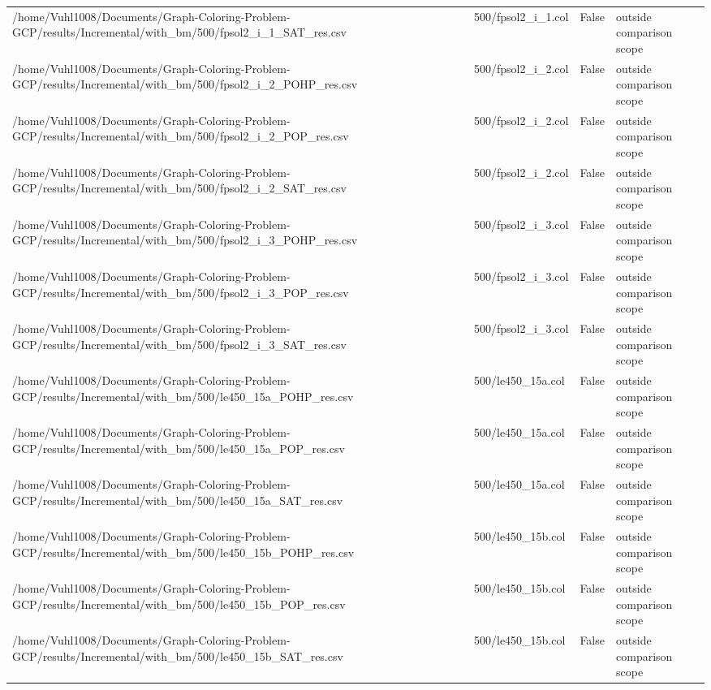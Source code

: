 \begin{table}[htbp]
\begin{tabular}{llll}
/home/Vuhl1008/Documents/Graph-Coloring-Problem-GCP/results/Incremental/with\_bm/500/fpsol2\_i\_1\_SAT\_res.csv & 500/fpsol2\_i\_1.col & False & outside comparison scope \\
/home/Vuhl1008/Documents/Graph-Coloring-Problem-GCP/results/Incremental/with\_bm/500/fpsol2\_i\_2\_POHP\_res.csv & 500/fpsol2\_i\_2.col & False & outside comparison scope \\
/home/Vuhl1008/Documents/Graph-Coloring-Problem-GCP/results/Incremental/with\_bm/500/fpsol2\_i\_2\_POP\_res.csv & 500/fpsol2\_i\_2.col & False & outside comparison scope \\
/home/Vuhl1008/Documents/Graph-Coloring-Problem-GCP/results/Incremental/with\_bm/500/fpsol2\_i\_2\_SAT\_res.csv & 500/fpsol2\_i\_2.col & False & outside comparison scope \\
/home/Vuhl1008/Documents/Graph-Coloring-Problem-GCP/results/Incremental/with\_bm/500/fpsol2\_i\_3\_POHP\_res.csv & 500/fpsol2\_i\_3.col & False & outside comparison scope \\
/home/Vuhl1008/Documents/Graph-Coloring-Problem-GCP/results/Incremental/with\_bm/500/fpsol2\_i\_3\_POP\_res.csv & 500/fpsol2\_i\_3.col & False & outside comparison scope \\
/home/Vuhl1008/Documents/Graph-Coloring-Problem-GCP/results/Incremental/with\_bm/500/fpsol2\_i\_3\_SAT\_res.csv & 500/fpsol2\_i\_3.col & False & outside comparison scope \\
/home/Vuhl1008/Documents/Graph-Coloring-Problem-GCP/results/Incremental/with\_bm/500/le450\_15a\_POHP\_res.csv & 500/le450\_15a.col & False & outside comparison scope \\
/home/Vuhl1008/Documents/Graph-Coloring-Problem-GCP/results/Incremental/with\_bm/500/le450\_15a\_POP\_res.csv & 500/le450\_15a.col & False & outside comparison scope \\
/home/Vuhl1008/Documents/Graph-Coloring-Problem-GCP/results/Incremental/with\_bm/500/le450\_15a\_SAT\_res.csv & 500/le450\_15a.col & False & outside comparison scope \\
/home/Vuhl1008/Documents/Graph-Coloring-Problem-GCP/results/Incremental/with\_bm/500/le450\_15b\_POHP\_res.csv & 500/le450\_15b.col & False & outside comparison scope \\
/home/Vuhl1008/Documents/Graph-Coloring-Problem-GCP/results/Incremental/with\_bm/500/le450\_15b\_POP\_res.csv & 500/le450\_15b.col & False & outside comparison scope \\
/home/Vuhl1008/Documents/Graph-Coloring-Problem-GCP/results/Incremental/with\_bm/500/le450\_15b\_SAT\_res.csv & 500/le450\_15b.col & False & outside comparison scope \\

\end{tabular}
\end{table}
